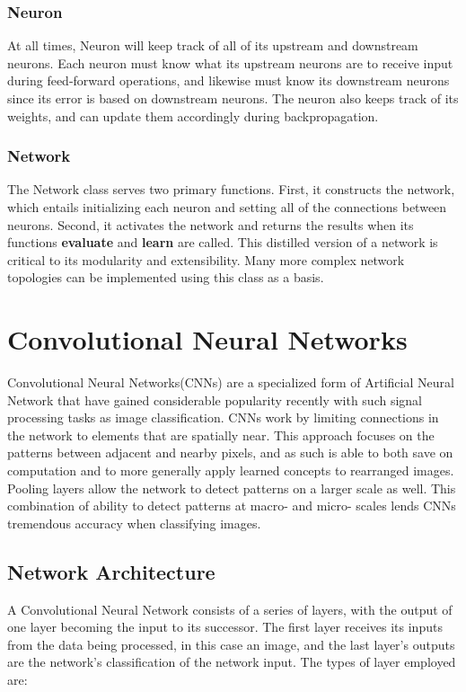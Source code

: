\documentclass[a4paper, 11pt]{article} %
\begin{document}
\subsubsection*{Neuron}

At all times, Neuron will keep track of all of its upstream and downstream neurons.  Each neuron must know what its upstream neurons are to receive input during feed-forward operations, and likewise must know its downstream neurons since its error is based on downstream neurons.  The neuron also keeps track of its weights, and can update them accordingly during backpropagation.

\subsubsection*{Network}

The Network class serves two primary functions.  First, it constructs the network, which entails initializing each neuron and setting all of the connections between neurons.  Second, it activates the network and returns the results when its functions \textbf{evaluate} and \textbf{learn} are called.  This distilled version of a network is critical to its modularity and extensibility.  Many more complex network topologies can be implemented using this class as a basis.

\section*{Convolutional Neural Networks}

Convolutional Neural Networks(CNNs) are a specialized form of Artificial Neural Network that have gained considerable popularity recently with such signal processing tasks as image classification.  CNNs work by limiting connections in the network to elements that are spatially near.  This approach focuses on the patterns between adjacent and nearby pixels, and as such is able to both save on computation and to more generally apply learned concepts to rearranged images.  Pooling layers allow the network to detect patterns on a larger scale as well.  This combination of ability to detect patterns at macro- and micro- scales lends CNNs tremendous accuracy when classifying images.

\subsection*{Network Architecture}

A Convolutional Neural Network consists of a series of layers, with the output of one layer becoming the input to its successor.  The first layer receives its inputs from the data being processed, in this case an image, and the last layer's outputs are the network's classification of the network input.  The types of layer employed are:
\end{document}
